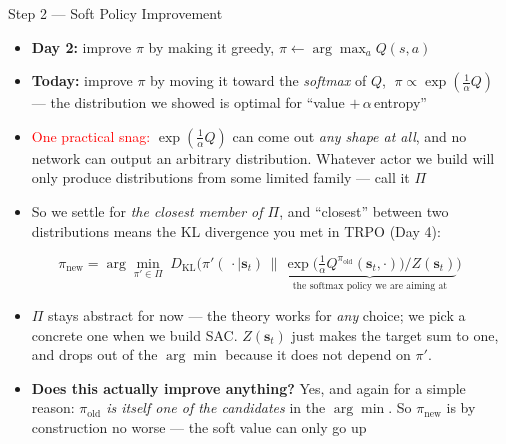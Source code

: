 \begin{frame}{Step 2 --- Soft Policy Improvement}
\small
\begin{itemize}
    \item \textbf{Day 2:} improve $\pi$ by making it greedy, $\pi \leftarrow \arg\max_a Q(s,a)$
    \item \textbf{Today:} improve $\pi$ by moving it toward the \emph{softmax} of $Q$, $\;\pi \propto \exp(\tfrac1\alpha Q)$ --- the distribution we showed is optimal for ``value $+\,\alpha\,$entropy''
    \vspace{0.4em}
    \item \textcolor{red}{One practical snag:} $\exp(\tfrac1\alpha Q)$ can come out \emph{any shape at all}, and no network can output an arbitrary distribution. Whatever actor we build will only produce distributions from some limited family --- call it $\Pi$
    \item So we settle for \emph{the closest member of $\Pi$}, and ``closest'' between two distributions means the KL divergence you met in TRPO (Day 4):
\end{itemize}
\[
\pi_{\text{new}} = \arg\min_{\pi' \in \Pi} \; D_{\mathrm{KL}}\!\Big( \pi'(\,\cdot \mid \mathbf{s}_t) \,\Big\|\, \underbrace{\exp\!\big( \tfrac{1}{\alpha} Q^{\pi_{\text{old}}}(\mathbf{s}_t, \cdot)\big) \big/ Z(\mathbf{s}_t)}_{\text{the softmax policy we are aiming at}} \Big)
\]
\vspace{-0.3em}
\begin{itemize}
    \item[] {\footnotesize $\Pi$ stays abstract for now --- the theory works for \emph{any} choice; we pick a concrete one when we build SAC. $Z(\mathbf{s}_t)$ just makes the target sum to one, and drops out of the $\arg\min$ because it does not depend on $\pi'$.}
    \vspace{0.4em}
    \item \textbf{Does this actually improve anything?} Yes, and again for a simple reason: \emph{$\pi_{\text{old}}$ is itself one of the candidates} in the $\arg\min$. So $\pi_{\text{new}}$ is by construction no worse --- the soft value can only go up
\end{itemize}
\end{frame}

